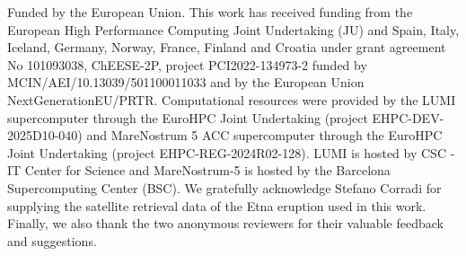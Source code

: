 \documentclass[acp,manuscript]{copernicus}
\begin{document}











\begin{acknowledgements}
  Funded by the European Union. This work has received funding from the European High Performance Computing Joint Undertaking (JU) and Spain, Italy, Iceland, Germany, Norway, France, Finland and Croatia under grant agreement No 101093038, ChEESE-2P, project PCI2022-134973-2 funded by MCIN/AEI/10.13039/501100011033 and by the European Union NextGenerationEU/PRTR.
  Computational resources were provided by the LUMI supercomputer through the EuroHPC Joint Undertaking (project EHPC-DEV-2025D10-040) and MareNostrum 5 ACC supercomputer through the EuroHPC Joint Undertaking (project EHPC-REG-2024R02-128). LUMI is hosted by CSC - IT Center for Science and  MareNostrum-5 is hosted by the Barcelona Supercomputing Center (BSC).
  We gratefully acknowledge Stefano Corradi for supplying the satellite retrieval data of the Etna eruption used in this work.
  Finally, we also thank the two anonymous reviewers for their valuable feedback and suggestions.
\end{acknowledgements}



\end{document}

